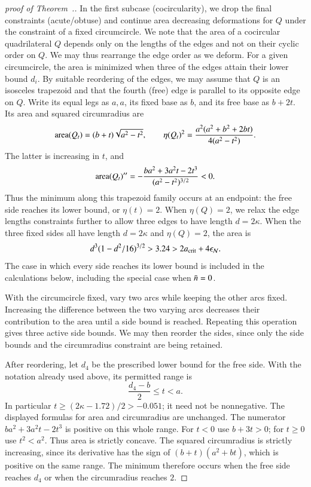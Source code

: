 \begin{proof}[proof of Theorem~.]
In the first subcase (cocircularity), we drop the final constraints
(acute/obtuse) and continue area decreasing deformations for $Q$ under
the constraint of a fixed circumcircle.  We note that the area of a
cocircular quadrilateral $Q$ depends only on the lengths of the edges
and not on their cyclic order on $Q$.  We may thus rearrange the edge
order as we deform.  For a given circumcircle, the area is minimized
when three of the edges attain their lower bound $d_i$.  By suitable
reordering of the edges, we may assume that $Q$ is an isosceles
trapezoid and that the fourth (free) edge is parallel to its opposite
edge on $Q$.  Write its equal legs as $a,a$,
its fixed base as $b$, and its free base as $b+2t$.
Its area and squared
circumradius are
\[
{\operatorname{area}}(Q_t)=(b+t)\sqrt{a^2-t^2},\qquad
\eta(Q_t)^2=\frac{a^2(a^2+b^2+2bt)}{4(a^2-t^2)}.
\]
The latter is increasing in $t$, and
\[
{\operatorname{area}}(Q_t)''=-\frac{ba^2+3a^2t-2t^3}{(a^2-t^2)^{3/2}}<0.
\]
Thus the minimum along this trapezoid family occurs at an endpoint:
the free side reaches its lower bound, or $\eta(t)=2$.  When
$\eta(Q)=2$, we relax the edge lengths constraints further to allow
three edges to have length $d=2\kappa$.
When the three fixed sides all have length $d=2\kappa$ and
$\eta(Q)=2$, the area is
\[
d^3(1-d^2/16)^{3/2}>3.24>2a_\text{crit}+4\epsilon_{\mathcal N}.
\]
The case in which every side reaches its lower bound is included
in the calculations below, including the special case when $\bar n=0$.

With the circumcircle fixed, vary two arcs while keeping
the other arcs fixed. Increasing the difference between the two
varying arcs decreases their contribution to the area until a side
bound is reached. Repeating this operation gives three active side
bounds. We may then reorder the sides, since only the side bounds
and the circumradius constraint are being retained.

After reordering, let $d_4$ be the prescribed lower bound for the free side. With
the notation already used above, its permitted range is
\[
\frac{d_4-b}{2}\le t<a.
\]
In particular $t\ge(2\kappa-1.72)/2>-0.051$; it need not be
nonnegative. The displayed formulas for area and circumradius are
unchanged. The numerator $ba^2+3a^2t-2t^3$ is positive on this
whole range. For $t<0$ use $b+3t>0$; for $t\ge0$ use $t^2<a^2$.
Thus area is strictly concave. The squared circumradius is strictly
increasing, since its derivative has the sign of
$(b+t)(a^2+bt)$, which is positive on the same range.
The minimum therefore occurs when the free side reaches $d_4$ or
when the circumradius reaches $2$.


\end{proof}
